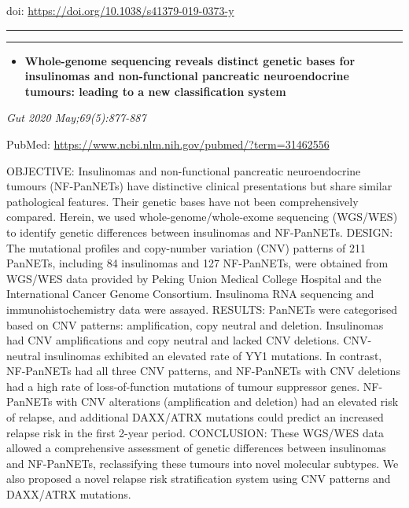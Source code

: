 \documentclass[
]{article}
\providecommand{\tightlist}{%
  \setlength{\itemsep}{0pt}\setlength{\parskip}{0pt}}
\begin{document}
doi: \url{https://doi.org/10.1038/s41379-019-0373-y}

\begin{center}\rule{0.5\linewidth}{0.5pt}\end{center}

\begin{center}\rule{0.5\linewidth}{0.5pt}\end{center}

\begin{itemize}
\tightlist
\item
  \textbf{Whole-genome sequencing reveals distinct genetic bases for
  insulinomas and non-functional pancreatic neuroendocrine tumours:
  leading to a new classification system}
\end{itemize}

\emph{Gut 2020 May;69(5):877-887}

PubMed: \url{https://www.ncbi.nlm.nih.gov/pubmed/?term=31462556}

OBJECTIVE: Insulinomas and non-functional pancreatic neuroendocrine
tumours (NF-PanNETs) have distinctive clinical presentations but share
similar pathological features. Their genetic bases have not been
comprehensively compared. Herein, we used whole-genome/whole-exome
sequencing (WGS/WES) to identify genetic differences between insulinomas
and NF-PanNETs. DESIGN: The mutational profiles and copy-number
variation (CNV) patterns of 211 PanNETs, including 84 insulinomas and
127 NF-PanNETs, were obtained from WGS/WES data provided by Peking Union
Medical College Hospital and the International Cancer Genome Consortium.
Insulinoma RNA sequencing and immunohistochemistry data were assayed.
RESULTS: PanNETs were categorised based on CNV patterns: amplification,
copy neutral and deletion. Insulinomas had CNV amplifications and copy
neutral and lacked CNV deletions. CNV-neutral insulinomas exhibited an
elevated rate of YY1 mutations. In contrast, NF-PanNETs had all three
CNV patterns, and NF-PanNETs with CNV deletions had a high rate of
loss-of-function mutations of tumour suppressor genes. NF-PanNETs with
CNV alterations (amplification and deletion) had an elevated risk of
relapse, and additional DAXX/ATRX mutations could predict an increased
relapse risk in the first 2-year period. CONCLUSION: These WGS/WES data
allowed a comprehensive assessment of genetic differences between
insulinomas and NF-PanNETs, reclassifying these tumours into novel
molecular subtypes. We also proposed a novel relapse risk stratification
system using CNV patterns and DAXX/ATRX mutations.
\end{document}
